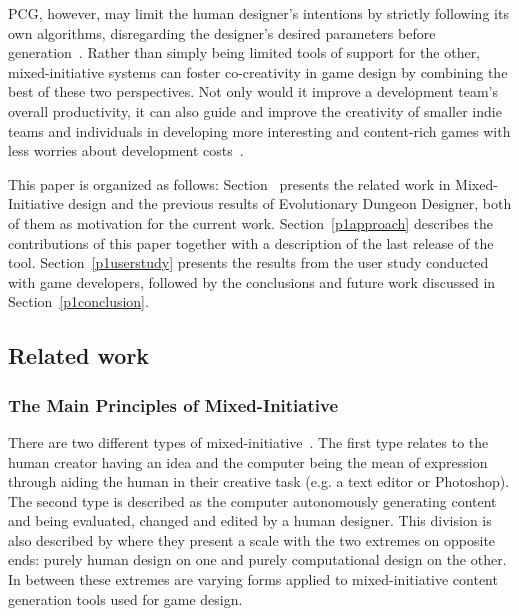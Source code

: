 PCG, however, may limit the human designer’s intentions by strictly following its own algorithms, disregarding the designer’s desired parameters before generation~. Rather than simply being limited tools of support for the other, mixed-initiative systems can foster co-creativity in game design by combining the best of these two perspectives. Not only would it improve a development team’s overall productivity, it can also guide and improve the creativity of smaller indie teams and individuals in developing more interesting and content-rich games with less worries about development costs~. 

This paper is organized as follows: Section~ presents the related work in Mixed-Initiative design and the previous results of Evolutionary Dungeon Designer, both of them as motivation for the current work. Section~\ref{p1approach} describes the contributions of this paper together with a description of the last release of the tool. Section~\ref{p1userstudy} presents the results from the user study conducted with game developers, followed by the conclusions and future work discussed in Section~\ref{p1conclusion}.

\subsection{Related work} \label{p1background}
\subsubsection{The Main Principles of Mixed-Initiative}

There are two different types of mixed-initiative~. The first type relates to the human creator having an idea and the computer being the mean of expression through aiding the human in their creative task (e.g. a text editor or Photoshop). The second type is described as the computer autonomously generating content and being evaluated, changed and edited by a human designer. This division is also described by  where they present a scale with the two extremes on opposite ends: purely human design on one and purely computational design on the other. In between these extremes are varying forms applied to mixed-initiative content generation tools used for game design. 

